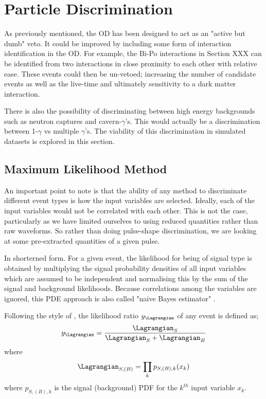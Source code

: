 \section{Particle Discrimination}
\par
As previously mentioned, the OD has been designed to act as an "active but dumb" veto.
It could be improved by including some form of interaction identification in the OD.
For example, the Bi-Po interactions in Section XXX can be identified from two interactions in close proximity to each other with relative ease.
These events could then be un-vetoed; increasing the number of candidate events as well as the live-time and ultimately sensitivity to a dark matter interaction.

\par
There is also the possibility of discriminating between high energy backgrounds such as neutron captures and cavern-$\gamma$'s.
This would actually be a discrimination between 1-$\gamma$ vs multiple $\gamma$'s.
The viability of this discrimination in simulated datasets is explored in this section.


\subsection{Maximum Likelihood Method}
\par
\par
An important point to note is that the ability of any method to discriminate different event types is how the input variables are selected.
Ideally, each of the input variables would not be correlated with each other.
This is not the case, particularly as we have limited ourselves to using reduced quantities rather than raw waveforms.
So rather than doing pulse-shape discrimination, we are looking at some pre-extracted quantities of a given pulse.

\par
In shorterned form. 
For a given event, the likelihood for being of signal type is obtained by multiplying the signal probability densities of all input variables which are assumed to be independent and normalising this by the sum of the signal and background likelihoods.
Because correlations among the variables are ignored, this PDE approach is also called "naive Bayes estimator" \cite{TMVA_ref}.

Following the style of \cite{TMVA_ref}, the likelihood ratio $y_{\Lagrangian}$ of any event is defined as;
\begin{equation}
    y_{\Lagrangian} = \frac{\Lagrangian_{S}}{\Lagrangian_{S} + \Lagrangian_{B}}
\end{equation}
where
\begin{equation}
    \Lagrangian_{S,(B)} = \prod_k p_{S,(B),k}(x_k)
\end{equation}
where $p_{S,(B),k}$ is the signal (background) PDF for the $k^{th}$ input variable $x_k$.


